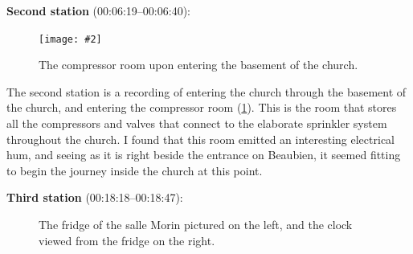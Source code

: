 \documentclass[12pt,twoside,maitrise]{dms_ks}
\newcommand{\customincludegraphics}[4][]{%
    \begin{figure}[H]
        \centering
        \texttt{[image: \#2]}
        \caption{#4}
	\label{#3} 
    \end{figure}
}
\theoremstyle{definition}
\begin{document}
{%

\textbf{Second station} (00:06:19--00:06:40):

\customincludegraphics[scale=0.25]{DSC00149_1.JPG}{fig:station2}{The compressor room upon entering the basement of the church.}%

The second station is a recording of entering the church through the basement of the church, and entering the compressor room (\cref{fig:station2}). 
This is the room that stores all the compressors and valves that connect to the elaborate sprinkler system throughout the church. 
I found that this room emitted an interesting electrical hum, and seeing as it is right beside the entrance on Beaubien, it seemed fitting to begin the journey inside the church at this point.

\textbf{Third station} (00:18:18--00:18:47):

\begin{figure}[h]
    \centering
    \caption{The fridge of the salle Morin pictured on the left, and the clock viewed from the fridge on the right.}
    \label{fig:station3}
\end{figure}

}
\end{document}
